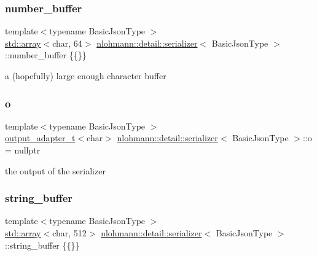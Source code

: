 \subsubsection{\texorpdfstring{number\+\_\+buffer}{number\_buffer}}
{\footnotesize\ttfamily template$<$typename Basic\+Json\+Type $>$ \\
\hyperlink{namespacenlohmann_1_1detail_a1ed8fc6239da25abcaf681d30ace4985af1f713c9e000f5d3f280adbd124df4f5}{std\+::array}$<$char, 64$>$ \hyperlink{classnlohmann_1_1detail_1_1serializer}{nlohmann\+::detail\+::serializer}$<$ Basic\+Json\+Type $>$\+::number\+\_\+buffer \{\{\}\}\hspace{0.3cm}{\ttfamily [private]}}



a (hopefully) large enough character buffer 

\mbox{\label{classnlohmann_1_1detail_1_1serializer_acf3c88660d3cbc65fc71c4d84f2a9f59}} 
\subsubsection{\texorpdfstring{o}{o}}
{\footnotesize\ttfamily template$<$typename Basic\+Json\+Type $>$ \\
\hyperlink{namespacenlohmann_1_1detail_a9b680ddfb58f27eb53a67229447fc556}{output\+\_\+adapter\+\_\+t}$<$char$>$ \hyperlink{classnlohmann_1_1detail_1_1serializer}{nlohmann\+::detail\+::serializer}$<$ Basic\+Json\+Type $>$\+::o = nullptr\hspace{0.3cm}{\ttfamily [private]}}



the output of the serializer 

\mbox{\label{classnlohmann_1_1detail_1_1serializer_a9c9b7ca63a66e59e5e7ffe8a2acf5c8f}} 
\subsubsection{\texorpdfstring{string\+\_\+buffer}{string\_buffer}}
{\footnotesize\ttfamily template$<$typename Basic\+Json\+Type $>$ \\
\hyperlink{namespacenlohmann_1_1detail_a1ed8fc6239da25abcaf681d30ace4985af1f713c9e000f5d3f280adbd124df4f5}{std\+::array}$<$char, 512$>$ \hyperlink{classnlohmann_1_1detail_1_1serializer}{nlohmann\+::detail\+::serializer}$<$ Basic\+Json\+Type $>$\+::string\+\_\+buffer \{\{\}\}\hspace{0.3cm}{\ttfamily [private]}}



